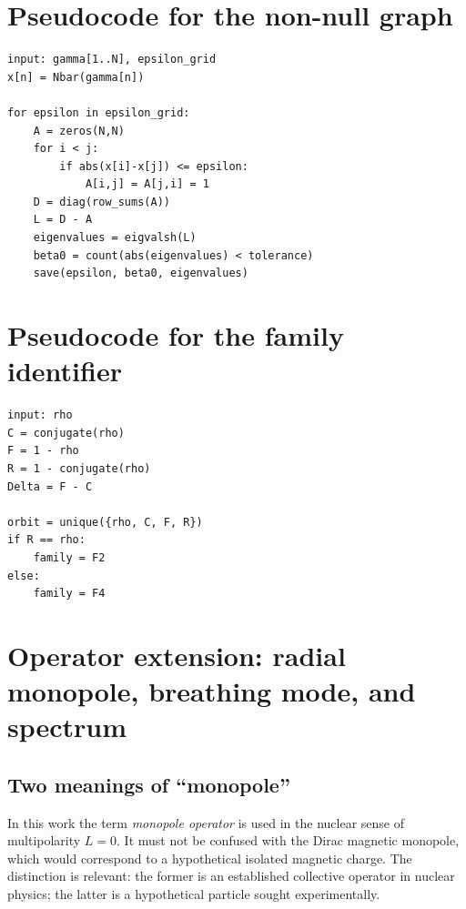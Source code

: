 \documentclass[11pt]{amsart}
\theoremstyle{definition}
\theoremstyle{remark}
\begin{document}
\appendix
\section{Pseudocode for the non-null graph}
\begin{verbatim}
input: gamma[1..N], epsilon_grid
x[n] = Nbar(gamma[n])

for epsilon in epsilon_grid:
    A = zeros(N,N)
    for i < j:
        if abs(x[i]-x[j]) <= epsilon:
            A[i,j] = A[j,i] = 1
    D = diag(row_sums(A))
    L = D - A
    eigenvalues = eigvalsh(L)
    beta0 = count(abs(eigenvalues) < tolerance)
    save(epsilon, beta0, eigenvalues)
\end{verbatim}

\section{Pseudocode for the family identifier}
\begin{verbatim}
input: rho
C = conjugate(rho)
F = 1 - rho
R = 1 - conjugate(rho)
Delta = F - C

orbit = unique({rho, C, F, R})
if R == rho:
    family = F2
else:
    family = F4
\end{verbatim}

\section{Operator extension: radial monopole, breathing mode, and spectrum}\label{sec:monopolo}
\subsection{Two meanings of ``monopole''}
In this work the term \emph{monopole operator} is used in the nuclear sense of multipolarity $L=0$. It must not be confused with the Dirac magnetic monopole, which would correspond to a hypothetical isolated magnetic charge. The distinction is relevant: the former is an established collective operator in nuclear physics; the latter is a hypothetical particle sought experimentally.
\end{document}
